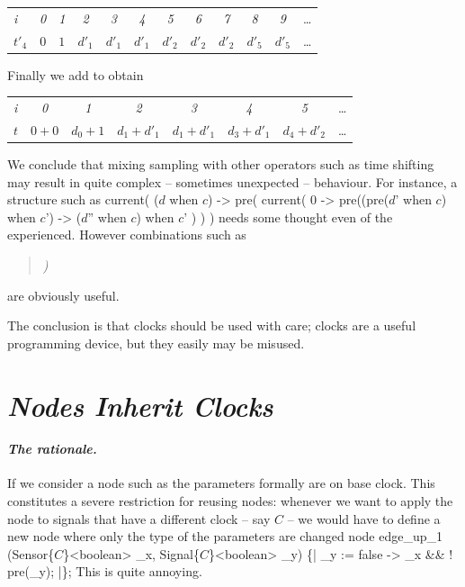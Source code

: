 {\begin{center}
\begin{tabular}[]{l@{\quad}||@{\quad} ccccccccccc}
    \hline\hline  
     \hbox{{\footnotesize \textit{i}}} &{\footnotesize \textit{0}}
     &{\footnotesize \textit{1}}&{\footnotesize \textit{2}}
     &{\footnotesize \textit{3}}&{\footnotesize \textit{4}}
     &{\footnotesize \textit{5}}&{\footnotesize \textit{6}}
     &{\footnotesize \textit{7}}&{\footnotesize \textit{8}}
     &{\footnotesize \textit{9}}&\ldots
   \\      
    \hbox{$t'_{4}$} 
    &$0$&$1$&$d'_1$&$d'_1$&$d'_1$&$d'_2$&$d'_2$&$d'_2$&$d'_5$&$d'_5$&\ldots
   \\
   \hline\hline
  \end{tabular}
\end{center}
Finally we add to obtain 
\begin{center}
  \leavevmode
  \begin{tabular}[]{l@{\quad}||@{\quad} ccccccc}
    \hline\hline  
     \hbox{{\footnotesize \textit{i}}} &{\footnotesize \textit{0}}
     &{\footnotesize \textit{1}}&{\footnotesize \textit{2}}
     &{\footnotesize \textit{3}}&{\footnotesize \textit{4}}
     &{\footnotesize \textit{5}}&\ldots
   \\      
    \hbox{$t$} 
    &$0+0$&$d_{0}+1$&$d_{1}+d'_1$&$d_{1}+d'_1$&$d_{3}+d'_1$&$d_{4}+d'_2$
    &\ldots
   \\
   \hline\hline
  \end{tabular}
\end{center}

We conclude that mixing sampling with other operators such as time shifting 
may result in quite complex -- sometimes unexpected -- behaviour. For instance, a structure such as
%
\BEP
current(
  ($d$ when $c$) ->
     pre(
       current(
         0 -> pre((pre($d$' when $c$) when $c$') -> ($d$'' when $c$) when $c$'
       )
     )
)
\EEP
%    
needs some thought even of the experienced. However combinations such as
\begin{quote}
\emph{)}
\end{quote}
are obviously useful. 

The conclusion is that clocks should be used with care; 
clocks are a useful programming device, but they easily 
may be misused.

\section{\textit{Nodes Inherit Clocks}}

\paragraph{\textit{The rationale.}}
If we consider a node such as
%
%
the parameters formally are on base clock. This constitutes a severe restriction for reusing nodes: whenever we
want to apply the node \emph{} to signals that have a different
clock -- say $C$ -- we would have to define a new node where only the type of the parameters are changed
%
\BEP
node edge\_up\_1 (Sensor\{$C$\}<boolean> \_x, Signal\{$C$\}<boolean> \_y) \{|
   \_y := false -> \_x \&\& ! pre(\_y);
|\};
\EEP
%
This is quite annoying. 

}
